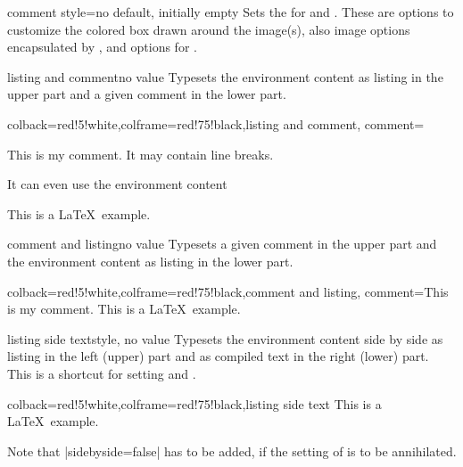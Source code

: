 \begin{docTcbKey}[][doc new=2014-11-14]{comment style}{=}{no default, initially empty}
  Sets the  for  and .
  These are  options to customize the colored box drawn around the
  image(s), also image options encapsulated by ,
  and  options for .
\end{docTcbKey}


\begin{docTcbKey}{listing and comment}{}{no value}
  Typesets the environment content as listing in the upper part and
  a given comment in the lower part.
\begin{dispExample}
\begin{tcblisting}{colback=red!5!white,colframe=red!75!black,listing and comment,
  comment={This is my comment. It may contain line breaks.\par
    It can even use the environment content
    \flqq\ignorespaces\tcbuselistingtext\unskip\frqq}}
This is a \LaTeX\ example.
\end{tcblisting}
\end{dispExample}
\end{docTcbKey}

\enlargethispage*{10mm}
\begin{docTcbKey}{comment and listing}{}{no value}
  Typesets a given comment in the upper part and
  the environment content as listing in the lower part.
\begin{dispExample}
\begin{tcblisting}{colback=red!5!white,colframe=red!75!black,comment and listing,
comment={This is my comment.}}
This is a \LaTeX\ example.
\end{tcblisting}
\end{dispExample}
\end{docTcbKey}


\clearpage
\begin{docTcbKey}{listing side text}{}{style, no value}
Typesets the environment content side by side as listing in the left (upper)
part and as compiled text in the right (lower) part.
This is a shortcut for setting  and .
\begin{dispExample}
\begin{tcblisting}{colback=red!5!white,colframe=red!75!black,listing side text}
This is a \LaTeX\ example.
\end{tcblisting}
\end{dispExample}
\begin{marker}
Note that |sidebyside=false| has to be added, if the setting of
 is to be annihilated.
\end{marker}
\end{docTcbKey}


